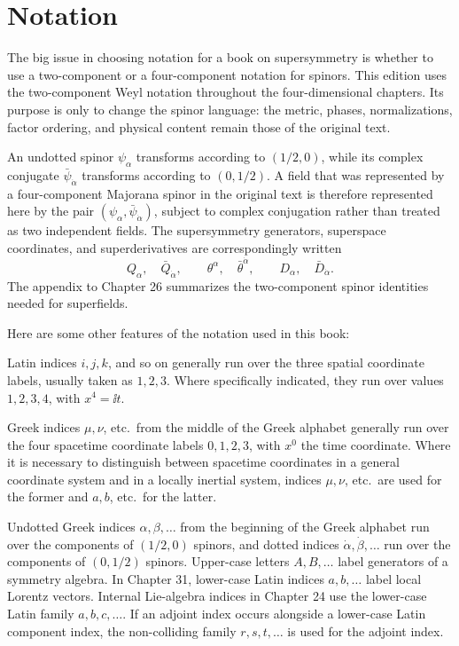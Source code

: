 \section*{Notation}


The big issue in choosing notation for a book on supersymmetry is whether to
use a two-component or a four-component notation for spinors.  This edition
uses the two-component Weyl notation throughout the four-dimensional
chapters.  Its purpose is only to change the spinor language: the metric,
phases, normalizations, factor ordering, and physical content remain those of
the original text.

An undotted spinor \(\psi_\alpha\) transforms according to
\((1/2,0)\), while its complex conjugate
\(\bar\psi_{\dot\alpha}\) transforms according to \((0,1/2)\).  A field that
was represented by a four-component Majorana spinor in the original text is
therefore represented here by the pair
\((\psi_\alpha,\bar\psi_{\dot\alpha})\), subject to complex conjugation rather
than treated as two independent fields.  The supersymmetry generators,
superspace coordinates, and superderivatives are correspondingly written
\[
  Q_\alpha,\quad\bar Q_{\dot\alpha},\qquad
  \theta^\alpha,\quad\bar\theta^{\dot\alpha},\qquad
  D_\alpha,\quad\bar D_{\dot\alpha}.
\]
The appendix to Chapter 26 summarizes the two-component spinor identities
needed for superfields.

Here are some other features of the notation used in this book:

Latin indices \(i,j,k\), and so on generally run over the three spatial
coordinate labels, usually taken as \(1,2,3\). Where specifically indicated,
they run over values \(1,2,3,4\), with \(x^4=\ii t\).

Greek indices \(\mu,\nu\), etc.\ from the middle of the Greek alphabet
generally run over the four spacetime coordinate labels \(0,1,2,3\), with
\(x^0\) the time coordinate. Where it is necessary to distinguish between
spacetime coordinates in a general coordinate system and in a locally inertial
system, indices \(\mu,\nu\), etc.\ are used for the former and \(a,b\), etc.\
for the latter.

Undotted Greek indices \(\alpha,\beta,\ldots\) from the beginning of the
Greek alphabet run over the components of \((1/2,0)\) spinors, and dotted
indices \(\dot\alpha,\dot\beta,\ldots\) run over the components of
\((0,1/2)\) spinors.  Upper-case letters \(A,B,\ldots\) label generators of a
symmetry algebra.  In Chapter 31, lower-case Latin indices \(a,b,\ldots\)
label local Lorentz vectors. Internal Lie-algebra indices in Chapter 24 use
the lower-case Latin family \(a,b,c,\ldots\). If an adjoint index occurs
alongside a lower-case Latin component index, the non-colliding family
\(r,s,t,\ldots\) is used for the adjoint index.

